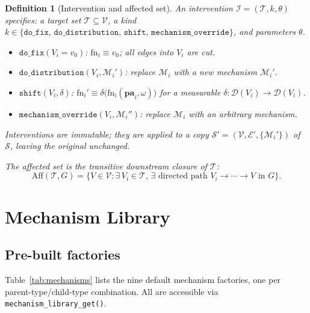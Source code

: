 \documentclass[12pt,a4paper]{article}
\newcommand{\fct}[1]{\mbox{\texttt{#1()}}}
\newtheorem{definition}{Definition}[section]
\begin{document}
\begin{definition}[Intervention and affected set]
\label{def:intervention}
An \emph{intervention} $\mathcal{I} = (\mathcal{T}, k, \theta)$ specifies:
a \emph{target set} $\mathcal{T}\subseteq\mathcal{V}$, a \emph{kind}
$k \in \{\mathtt{do\_fix},\, \mathtt{do\_distribution},\, \mathtt{shift},\,
\mathtt{mechanism\_override}\}$, and \emph{parameters} $\theta$.

\begin{itemize}[nosep,leftmargin=2em]
  \item $\mathtt{do\_fix}(V_i = v_0)$: $\mathrm{fn}_i \equiv v_0$; all edges
        into $V_i$ are cut.
  \item $\mathtt{do\_distribution}(V_i, \mathcal{M}_i')$: replace $\mathcal{M}_i$
        with a new mechanism $\mathcal{M}_i'$.
  \item $\mathtt{shift}(V_i, \delta)$: $\mathrm{fn}_i' \equiv
        \delta\bigl(\mathrm{fn}_i(\mathbf{pa}_i, \omega)\bigr)$ for a
        measurable $\delta:\mathcal{D}(V_i)\to\mathcal{D}(V_i)$.
  \item $\mathtt{mechanism\_override}(V_i, \mathcal{M}_i'')$: replace
        $\mathcal{M}_i$ with an arbitrary mechanism.
\end{itemize}

Interventions are immutable; they are applied to a \emph{copy}
$\mathcal{S}' = (\mathcal{V}, \mathcal{E}', \{\mathcal{M}_i'\})$ of $\mathcal{S}$,
leaving the original unchanged.

The \emph{affected set} is the transitive downstream closure of $\mathcal{T}$:
\[
  \mathrm{Aff}(\mathcal{T}, G) = \bigl\{V\in\mathcal{V} : \exists\, V_i\in\mathcal{T},\,
  \exists\text{ directed path } V_i \to \cdots \to V \text{ in } G\bigr\}.
\]
\end{definition}

\section{Mechanism Library}
\label{sec:mechanisms}

\subsection{Pre-built factories}
\label{sec:prebuilt}

Table~\ref{tab:mechanisms} lists the nine default mechanism factories, one per
parent-type/child-type combination. All are accessible via
\fct{mechanism\_library\_get}.
\end{document}

